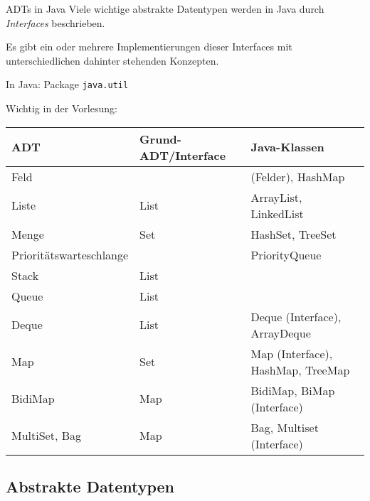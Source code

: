 \begin{bonus}{ADTs in Java}
    Viele wichtige abstrakte Datentypen werden in Java durch \emph{Interfaces} beschrieben.

    Es gibt ein oder mehrere Implementierungen dieser Interfaces mit unterschiedlichen dahinter stehenden Konzepten.

    In Java: Package \texttt{java.util}

    Wichtig in der Vorlesung:

    \begin{tabular}{l|l|l}
        ADT                     & Grund-ADT/Interface & Java-Klassen                      \\
        \hline
        Feld                    &                     & (Felder), HashMap                 \\
        Liste                   & List                & ArrayList, LinkedList             \\
        Menge                   & Set                 & HashSet, TreeSet                  \\
        Prioritätswarteschlange &                     & PriorityQueue                     \\
        Stack                   & List                &                                   \\
        Queue                   & List                &                                   \\
        Deque                   & List                & Deque (Interface), ArrayDeque     \\
        Map                     & Set                 & Map (Interface), HashMap, TreeMap \\
        BidiMap                 & Map                 & BidiMap, BiMap (Interface)        \\
        MultiSet, Bag           & Map                 & Bag, Multiset (Interface)
    \end{tabular}
\end{bonus}

\subsection{Abstrakte Datentypen}

